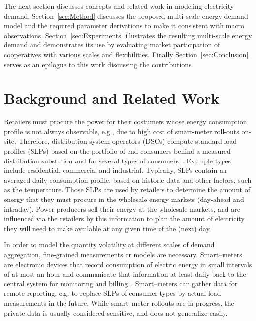 \documentclass[conference]{IEEEtran}
\begin{document}
The next section discusses concepts and related work in modeling electricity demand. Section~\ref{sec:Method} discusses the proposed multi-scale energy demand model and the required parameter derivations to make it consistent with macro observations. Section~\ref{sec:Experiments} illustrates the resulting multi-scale energy demand and demonstrates its use by evaluating market participation of cooperatives with various scales and flexibilities. Finally Section~\ref{sec:Conclusion} serves as an epilogue to this work discussing the contributions.

\section{Background and Related Work}
\label{sec:Related}

Retailers must procure the power for their costumers whose energy consumption profile is not always observable, e.g., due to high cost of smart-meter roll-outs on-site.
Therefore, distribution system operators (DSOs) compute standard load profiles (SLPs) based on the portfolio of end-consumers behind a measured distribution substation and for several types of consumers~\cite{jardini2000daily}. Example types include residential, commercial and industrial. Typically, SLPs contain an averaged daily consumption profile, based on historic data and other factors, such as the temperature. Those SLPs are used by retailers to determine the amount of energy that they must procure in the wholesale energy markets (day-ahead and intraday). Power producers sell their energy at the wholesale markets, and are influenced via the retailers by this information to plan the amount of electricity they will need to make available at any given time of the (next) day.

In order to model the quantity volatility at different scales of demand aggregation, fine-grained measurements or models are necessary.
Smart--meters are electronic devices that record consumption of electric energy in small intervals of at most an hour and communicate that information at least daily back to the central system for monitoring and billing~\cite{depuru2011smart}. Smart--meters can gather data for remote reporting, e.g. to replace SLPs of consumer types by actual load measurements in the future. While smart--meter rollouts are in progress, the private data is usually considered sensitive, and does not generalize easily. %
\end{document}
